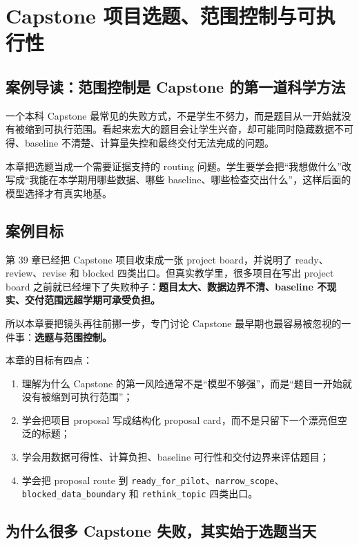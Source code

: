 \chapter{Capstone 项目选题、范围控制与可执行性}

\section{案例导读：范围控制是 Capstone 的第一道科学方法}

一个本科 Capstone 最常见的失败方式，不是学生不努力，而是题目从一开始就没有被缩到可执行范围。看起来宏大的题目会让学生兴奋，却可能同时隐藏数据不可得、baseline 不清楚、计算量失控和最终交付无法完成的问题。

本章把选题当成一个需要证据支持的 routing 问题。学生要学会把“我想做什么”改写成“我能在本学期用哪些数据、哪些 baseline、哪些检查交出什么”，这样后面的模型选择才有真实地基。

\section{案例目标}

第 39 章已经把 Capstone 项目收束成一张 project board，并说明了 ready、review、revise 和 blocked 四类出口。但真实教学里，很多项目在写出 project board 之前就已经埋下了失败种子：\textbf{题目太大、数据边界不清、baseline 不现实、交付范围远超学期可承受负担。}

所以本章要把镜头再往前挪一步，专门讨论 Capstone 最早期也最容易被忽视的一件事：\textbf{选题与范围控制。}

本章的目标有四点：

\begin{enumerate}
    \item 理解为什么 Capstone 的第一风险通常不是“模型不够强”，而是“题目一开始就没有被缩到可执行范围”；
    \item 学会把项目 proposal 写成结构化 proposal card，而不是只留下一个漂亮但空泛的标题；
    \item 学会用数据可得性、计算负担、baseline 可行性和交付边界来评估题目；
    \item 学会把 proposal route 到 \texttt{ready\_for\_pilot}、\texttt{narrow\_scope}、\texttt{blocked\_data\_boundary} 和 \texttt{rethink\_topic} 四类出口。
\end{enumerate}

\section{为什么很多 Capstone 失败，其实始于选题当天}

